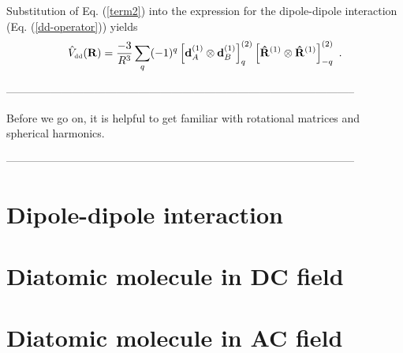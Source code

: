 Substitution of Eq. (\ref{term2}) into the expression for the dipole-dipole interaction (Eq. (\ref{dd-operator})) yields
\begin{equation}
\hat{V}_{\mbox{\tiny dd}}(\mathbf{R}) = \frac{-3}{R^{3}} \sum_{q} (-1)^{q} \left[ \mathbf{d}_{A}^{(1)} \otimes \mathbf{d}_{B}^{(1)} \right]^{(2)}_{q} \left[ \mathbf{\hat{R}}^{(1)} \otimes \mathbf{\hat{R}}^{(1)} \right]^{(2)}_{-q} \ .
\end{equation}

-----------------------------------------------------------------------------------------------

Before we go on, it is helpful to get familiar with rotational matrices and spherical harmonics.


-----------------------------------------------------------------------------------------------

\section{Dipole-dipole interaction}
\label{sec::ddInteraction}

\section{Diatomic molecule in DC field}
\label{sec:moleculeInDCField}


\section{Diatomic molecule in AC field}
\label{sec:moleculeInACField}

